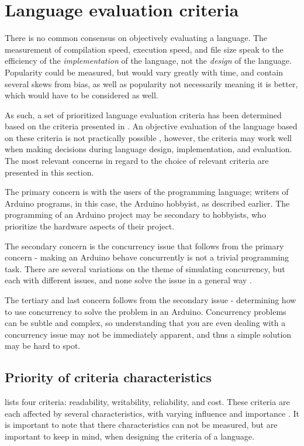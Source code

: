 \section{Language evaluation criteria}\label{sec:languageeval}
There is no common consensus on objectively evaluating a language. The measurement of compilation speed, execution speed, and file size speak to the efficiency of the \textit{implementation} of the language, not the \textit{design} of the language. Popularity could be measured, but would vary greatly with time, and contain several skews from bias,  as well as popularity not necessarily meaning it is better, which would have to be considered as well.

As such, a set of prioritized language evaluation criteria has been determined based on the criteria presented in \cite{Sebesta2016}. An objective evaluation of the language based on these criteria is not practically possible \cite{Sebesta2016}, however, the criteria may work well when making decisions during language design, implementation, and evaluation. The most relevant concerns in regard to the choice of relevant criteria are presented in this section.

The primary concern is with the users of the programming language; writers of Arduino programs, in this case, the Arduino hobbyist, as described earlier. The programming of an Arduino project may be secondary to hobbyists, who prioritize the hardware aspects of their project.

The secondary concern is the concurrency issue that follows from the primary concern - making an Arduino behave concurrently is not a trivial programming task. There are several variations on the theme of simulating concurrency, but each with different issues, and none solve the issue in a general way \cite{Restucia2022}.

The tertiary and last concern follows from the secondary issue - determining how to use concurrency to solve the problem in an Arduino. Concurrency problems can be subtle and complex, so understanding that you are even dealing with a concurrency issue may not be immediately apparent, and thus a simple solution may be hard to spot.

\subsection{Priority of criteria characteristics}
 lists four criteria: readability, writability, reliability, and cost. These criteria are each affected by several characteristics, with varying influence and importance \cite{Sebesta2016}. It is important to note that there characteristics can not be measured, but are important to keep in mind, when designing the criteria of a language.

